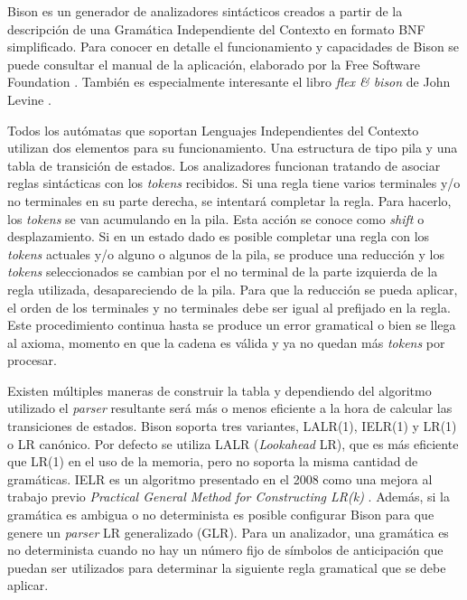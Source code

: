 Bison es un generador de analizadores sintácticos creados a partir de la descripción de una Gramática Independiente del Contexto en formato BNF simplificado. Para conocer en detalle el funcionamiento y capacidades de Bison se puede consultar el manual de la aplicación, elaborado por la Free Software Foundation
\cite{fsf_web_bisonManual}. También es especialmente interesante el libro \emph{flex \& bison} de John Levine \cite{levine_book_flexBison}.

\label{automatas-pila} Todos los autómatas que soportan Lenguajes Independientes del Contexto utilizan dos elementos para su funcionamiento. Una estructura de tipo pila y una tabla de transición de estados. Los analizadores funcionan tratando de asociar reglas sintácticas con los \emph{tokens} recibidos. Si una regla tiene varios terminales y/o no terminales en su parte derecha, se intentará completar la regla. Para hacerlo, los \emph{tokens} se van acumulando en la pila. Esta acción se conoce como \emph{shift} o desplazamiento. Si en un estado dado es posible completar una regla con los \emph{tokens} actuales y/o alguno o algunos de la pila, se produce una reducción y los \emph{tokens} seleccionados se cambian por el no terminal de la parte izquierda de la regla utilizada, desapareciendo de la pila. Para que la reducción se pueda aplicar, el orden de los terminales y no terminales debe ser igual al prefijado en la regla. Este procedimiento continua hasta se produce un error gramatical o bien se llega al axioma, momento en que la cadena es válida y ya no quedan más \emph{tokens} por procesar.

Existen múltiples maneras de construir la tabla y dependiendo del algoritmo utilizado el \emph{parser} resultante será más o menos eficiente a la hora de calcular las transiciones de estados. Bison soporta tres variantes, LALR(1), IELR(1) y LR(1) o LR canónico. Por defecto se utiliza LALR (\emph{Lookahead} LR), que es más eficiente que LR(1) en el uso de la memoria, pero no soporta la misma cantidad de gramáticas. IELR es un algoritmo presentado en el 2008 \cite{dennyMalloy_paper_IELRAlgorithm} como una mejora al trabajo previo \emph{Practical General Method for Constructing LR(k)} \cite{pager_paper_constructLRparsers}. Además, si la gramática es ambigua o no determinista es posible configurar Bison para que genere un \emph{parser} LR generalizado (GLR). Para un analizador, una gramática es no determinista cuando no hay un número fijo de símbolos de anticipación que puedan ser utilizados para determinar la siguiente regla gramatical que se debe aplicar.

